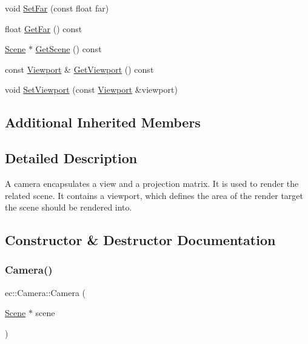 \begin{DoxyCompactItemize}
\item 
void \mbox{\hyperlink{classec_1_1_camera_adb376b3c35aed1e7681f74ddbbe9fa25}{Set\+Far}} (const float far)
\item 
float \mbox{\hyperlink{classec_1_1_camera_a5bdbf9c5001e666bed13a5c75fd1c88f}{Get\+Far}} () const
\item 
\mbox{\hyperlink{classec_1_1_scene}{Scene}} $\ast$ \mbox{\hyperlink{classec_1_1_camera_a77f8c613ff916b697bdab94d4a610e5d}{Get\+Scene}} () const
\item 
const \mbox{\hyperlink{classec_1_1_viewport}{Viewport}} \& \mbox{\hyperlink{classec_1_1_camera_a6997f9c09e6cf43b1e7440eb2af83eb2}{Get\+Viewport}} () const
\item 
void \mbox{\hyperlink{classec_1_1_camera_a30dab960758a3614624cada979abdd5a}{Set\+Viewport}} (const \mbox{\hyperlink{classec_1_1_viewport}{Viewport}} \&viewport)
\end{DoxyCompactItemize}
\subsection*{Additional Inherited Members}


\subsection{Detailed Description}
A camera encapsulates a view and a projection matrix. It is used to render the related scene. It contains a viewport, which defines the area of the render target the scene should be rendered into. 

\subsection{Constructor \& Destructor Documentation}
\mbox{\label{classec_1_1_camera_a5b8034c32e082171bdb61033781cdcc3}} 
\subsubsection{\texorpdfstring{Camera()}{Camera()}\hspace{0.1cm}{\footnotesize\ttfamily [1/2]}}
{\footnotesize\ttfamily ec\+::\+Camera\+::\+Camera (\begin{DoxyParamCaption}\item[{\mbox{\hyperlink{classec_1_1_scene}{Scene}} $\ast$}]{scene }\end{DoxyParamCaption})\hspace{0.3cm}{\ttfamily [explicit]}}


